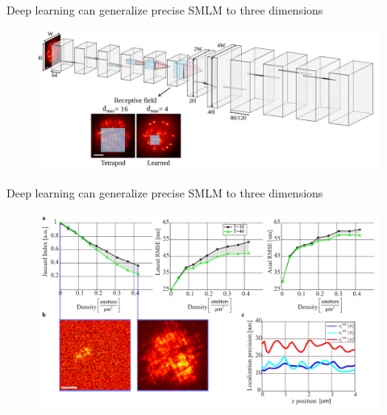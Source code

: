 \documentclass{beamer}					%
\begin{document}
\begin{frame}{Deep learning can generalize precise SMLM to three dimensions}
\begin{figure}
\includegraphics[width=13cm]{Architecture.png}
\end{figure}
\end{frame}

\begin{frame}{Deep learning can generalize precise SMLM to three dimensions}
\begin{figure}
\includegraphics[width=12cm]{Jaccard.png}
\end{figure}
\end{frame}
\end{document}
